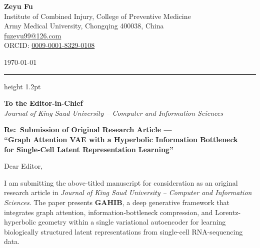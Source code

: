 \documentclass[11pt,a4paper]{article}
\newcommand{\journalFull}{Journal of King Saud University --
  Computer and Information Sciences}
\begin{document}
\thispagestyle{fancy}

\noindent
\begin{minipage}[t]{0.62\linewidth}
  {\Large\bfseries\color{accentblue} Zeyu Fu}\\[3pt]
  {\small\color{darkgray}
    Institute of Combined Injury, College of Preventive Medicine\\
    Army Medical University, Chongqing 400038, China\\
    \href{mailto:fuzeyu99@126.com}{fuzeyu99@126.com}\\
    ORCID: \href{https://orcid.org/0009-0001-8329-0108}{0009-0001-8329-0108}}
\end{minipage}%
\hfill
\begin{minipage}[t]{0.34\linewidth}
  \raggedleft
  {\small\color{darkgray}\today}
\end{minipage}

\vspace{4pt}
{\color{ruleblue}\hrule height 1.2pt}
\vspace{8pt}

\noindent
{\small\color{darkgray}%
\textbf{To the Editor-in-Chief}\\
\textit{\journalFull}}

\vspace{6pt}

\noindent\textbf{\large\color{accentblue}%
  Re:\ Submission of Original Research Article ---\\[2pt]
  ``Graph Attention VAE with a Hyperbolic Information Bottleneck\\
  for Single-Cell Latent Representation Learning''}

\vspace{8pt}

\noindent Dear Editor,

\vspace{2pt}

I am submitting the above-titled manuscript for consideration as
an original research article in \textit{\journalFull}.
The paper presents \textbf{GAHIB}, a deep generative framework that
integrates graph attention, information-bottleneck compression, and
Lorentz-hyperbolic geometry within a single variational autoencoder
for learning biologically structured latent representations from
single-cell RNA-sequencing data.
\end{document}

